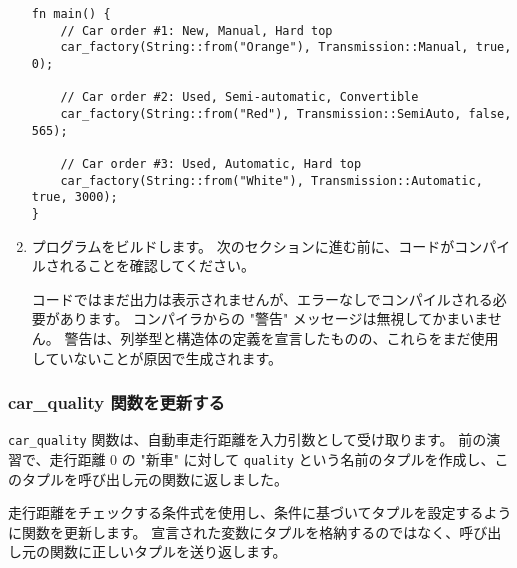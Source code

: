 \begin{enumerate}
\begin{lstlisting}[numbers=none]
fn main() {
    // Car order #1: New, Manual, Hard top
    car_factory(String::from("Orange"), Transmission::Manual, true, 0);

    // Car order #2: Used, Semi-automatic, Convertible
    car_factory(String::from("Red"), Transmission::SemiAuto, false, 565);

    // Car order #3: Used, Automatic, Hard top
    car_factory(String::from("White"), Transmission::Automatic, true, 3000);
}
\end{lstlisting}

\item プログラムをビルドします。 次のセクションに進む前に、コードがコンパイルされることを確認してください。

コードではまだ出力は表示されませんが、エラーなしでコンパイルされる必要があります。 コンパイラからの "警告" メッセージは無視してかまいません。 警告は、列挙型と構造体の定義を宣言したものの、これらをまだ使用していないことが原因で生成されます。

\end{enumerate}

\subsubsection{car\_quality 関数を更新する}

\texttt{car\_quality} 関数は、自動車走行距離を入力引数として受け取ります。 前の演習で、走行距離 0 の "新車" に対して \texttt{quality} という名前のタプルを作成し、このタプルを呼び出し元の関数に返しました。

走行距離をチェックする条件式を使用し、条件に基づいてタプルを設定するように関数を更新します。 宣言された変数にタプルを格納するのではなく、呼び出し元の関数に正しいタプルを送り返します。


